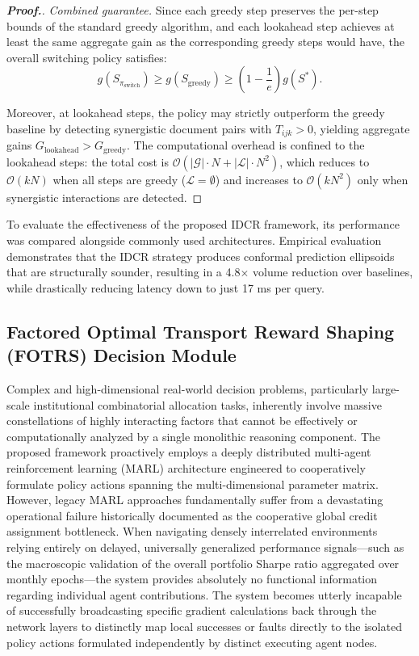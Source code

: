 \documentclass[12pt,a4paper,oneside]{report}
\theoremstyle{definition}
\theoremstyle{remark}
\begin{document}
\begin{proof}[\textbf{Proof.}]
\medskip
\noindent\textit{Combined guarantee.}
Since each greedy step preserves the per-step bounds of the standard greedy algorithm, and each lookahead step achieves at least the same aggregate gain as the corresponding greedy steps would have, the overall switching policy satisfies:
\[
g(S_{\pi_{\text{switch}}}) \geq g(S_{\text{greedy}}) \geq \left(1 - \frac{1}{e}\right) g(S^*).
\]

Moreover, at lookahead steps, the policy may strictly outperform the greedy baseline by detecting synergistic document pairs with $T_{ijk} > 0$, yielding aggregate gains $G_{\text{lookahead}} > G_{\text{greedy}}$. The computational overhead is confined to the lookahead steps: the total cost is $\mathcal{O}(|\mathcal{G}| \cdot N + |\mathcal{L}| \cdot N^2)$, which reduces to $\mathcal{O}(kN)$ when all steps are greedy ($\mathcal{L} = \emptyset$) and increases to $\mathcal{O}(kN^2)$ only when synergistic interactions are detected.
\end{proof}

To evaluate the effectiveness of the proposed IDCR framework, its performance was compared alongside commonly used architectures. Empirical evaluation demonstrates that the IDCR strategy produces conformal prediction ellipsoids that are structurally sounder, resulting in a 4.8$\times$ volume reduction over baselines, while drastically reducing latency down to just 17 ms per query.

\subsection{Factored Optimal Transport Reward Shaping (FOTRS) Decision Module}
Complex and high-dimensional real-world decision problems, particularly large-scale institutional combinatorial allocation tasks, inherently involve massive constellations of highly interacting factors that cannot be effectively or computationally analyzed by a single monolithic reasoning component. The proposed framework proactively employs a deeply distributed multi-agent reinforcement learning (MARL) architecture engineered to cooperatively formulate policy actions spanning the multi-dimensional parameter matrix. However, legacy MARL approaches fundamentally suffer from a devastating operational failure historically documented as the cooperative global credit assignment bottleneck. When navigating densely interrelated environments relying entirely on delayed, universally generalized performance signals—such as the macroscopic validation of the overall portfolio Sharpe ratio aggregated over monthly epochs—the system provides absolutely no functional information regarding individual agent contributions. The system becomes utterly incapable of successfully broadcasting specific gradient calculations back through the network layers to distinctly map local successes or faults directly to the isolated policy actions formulated independently by distinct executing agent nodes.
\end{document}
